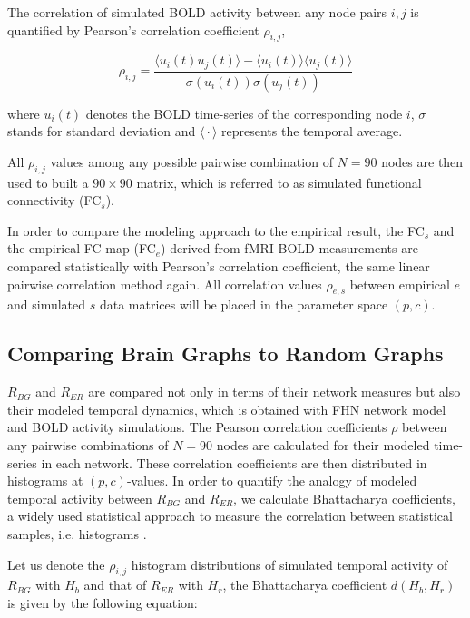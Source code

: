 \documentclass[fleqn,10pt]{wlpeerj}
\begin{document}
The correlation of simulated BOLD activity between any node pairs $i,j$ is quantified by Pearson's correlation coefficient $\rho_{i,j}$, 

\begin{equation}
\rho_{i,j} = \dfrac{\big \langle u_i(t) u_{j}(t) \big \rangle - \big \langle u_{i}(t) \big \rangle  \big \langle u_{j}(t) \big \rangle}{ \sigma (u_i(t)) \sigma (u_j(t))}
\end{equation}

where $u_i(t)$ denotes the BOLD time-series of the corresponding node $i$,  $\sigma$ stands for standard deviation and $\big \langle \cdot \big \rangle$ represents the temporal average. 

All $\rho_{i,j}$ values among any possible pairwise combination of $N=90$ nodes are then used to built a $90\times 90$  matrix, which is referred to as simulated functional connectivity (FC$_s$). 

In order to compare the modeling approach to the empirical result, the FC$_s$ and the empirical FC map (FC$_e$) derived from fMRI-BOLD measurements are compared statistically with Pearson's correlation coefficient, the same linear pairwise correlation method again. All correlation values $\rho_{e,s}$ between empirical $e$ and simulated $s$ data matrices will be placed in the parameter space $(p,c)$. 

\subsection*{Comparing Brain Graphs to Random Graphs}
$R_{BG}$ and $R_{ER}$ are compared not only in terms of their network measures but also their modeled temporal dynamics, which is obtained with FHN network model and BOLD activity simulations. The Pearson correlation coefficients $\rho$ between any pairwise combinations of $N=90$ nodes are calculated for their modeled time-series in each network. These correlation coefficients are then distributed in histograms at $(p,c)$-values. In order to quantify the analogy of modeled temporal activity between $R_{BG}$ and $R_{ER}$, we calculate Bhattacharya coefficients, a widely used statistical approach to measure the correlation between statistical samples, i.e. histograms \citep{XYZ43}.

Let us denote the $\rho_{i,j}$ histogram distributions of simulated temporal activity of $R_{BG}$ with $H_b$ and that of $R_{ER}$ with $H_r$, the Bhattacharya coefficient $d(H_b, H_r)$ is given by the following equation:
\end{document}
